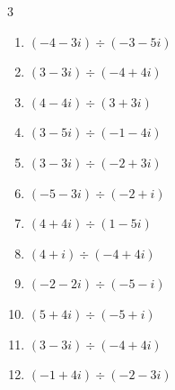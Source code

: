 \begin{multicols}{3}
\begin{enumerate}
  \item $\displaystyle (-4-3i)\div(-3-5i)$


  \item $\displaystyle (3-3i)\div(-4+4i)$


\columnbreak %

  \item $\displaystyle (4-4i)\div(3+3i)$


  \item $\displaystyle (3-5i)\div(-1-4i)$

        \phantom{$\displaystyle =1+i$}

  \item $\displaystyle (3-3i)\div(-2+3i)$


  \item $\displaystyle (-5-3i)\div(-2+i)$


  \item $\displaystyle (4+4i)\div(1-5i)$


  \item $\displaystyle (4+i)\div(-4+4i)$


  \item $\displaystyle (-2-2i)\div(-5-i)$


  \item $\displaystyle (5+4i)\div(-5+i)$


  \item $\displaystyle (3-3i)\div(-4+4i)$


  \item $\displaystyle (-1+4i)\div(-2-3i)$


\end{enumerate}
\end{multicols}
